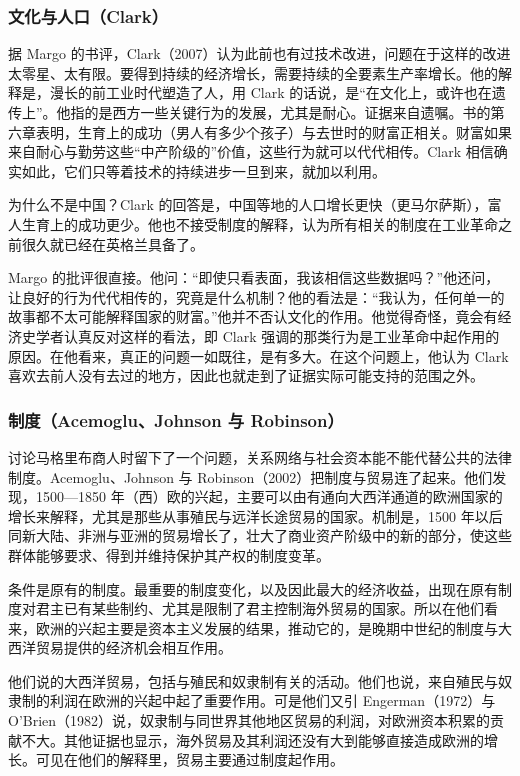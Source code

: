 \subsubsection{文化与人口（Clark）}
据 Margo 的书评，Clark（2007）认为此前也有过技术改进，问题在于这样的改进太零星、太有限。要得到持续的经济增长，需要持续的全要素生产率增长\cite{clark2007,margo2008}。他的解释是，漫长的前工业时代塑造了人，用 Clark 的话说，是“在文化上，或许也在遗传上”。他指的是西方一些关键行为的发展，尤其是耐心\cite{clark2007,margo2008}。证据来自遗嘱。书的第六章表明，生育上的成功（男人有多少个孩子）与去世时的财富正相关。财富如果来自耐心与勤劳这些“中产阶级的”价值，这些行为就可以代代相传。Clark 相信确实如此，它们只等着技术的持续进步一旦到来，就加以利用\cite{margo2008}。

为什么不是中国？Clark 的回答是，中国等地的人口增长更快（更马尔萨斯），富人生育上的成功更少。他也不接受制度的解释，认为所有相关的制度在工业革命之前很久就已经在英格兰具备了\cite{margo2008}。

Margo 的批评很直接。他问：“即使只看表面，我该相信这些数据吗？”他还问，让良好的行为代代相传的，究竟是什么机制？他的看法是：“我认为，任何单一的故事都不太可能解释国家的财富。”\cite{margo2008}他并不否认文化的作用。他觉得奇怪，竟会有经济史学者认真反对这样的看法，即 Clark 强调的那类行为是工业革命中起作用的原因。在他看来，真正的问题一如既往，是有多大。在这个问题上，他认为 Clark 喜欢去前人没有去过的地方，因此也就走到了证据实际可能支持的范围之外\cite{margo2008}。

\subsubsection{制度（Acemoglu、Johnson 与 Robinson）}
讨论马格里布商人时留下了一个问题，关系网络与社会资本能不能代替公共的法律制度。Acemoglu、Johnson 与 Robinson（2002）把制度与贸易连了起来\cite{ajr2002}。他们发现，1500—1850 年（西）欧的兴起，主要可以由有通向大西洋通道的欧洲国家的增长来解释，尤其是那些从事殖民与远洋长途贸易的国家。机制是，1500 年以后同新大陆、非洲与亚洲的贸易增长了，壮大了商业资产阶级中的新的部分，使这些群体能够要求、得到并维持保护其产权的制度变革\cite{ajr2002}。

条件是原有的制度。最重要的制度变化，以及因此最大的经济收益，出现在原有制度对君主已有某些制约、尤其是限制了君主控制海外贸易的国家\cite{ajr2002}。所以在他们看来，欧洲的兴起主要是资本主义发展的结果，推动它的，是晚期中世纪的制度与大西洋贸易提供的经济机会相互作用\cite{ajr2002}。

他们说的大西洋贸易，包括与殖民和奴隶制有关的活动。他们也说，来自殖民与奴隶制的利润在欧洲的兴起中起了重要作用\cite{ajr2002}。可是他们又引 Engerman（1972）与 O'Brien（1982）说，奴隶制与同世界其他地区贸易的利润，对欧洲资本积累的贡献不大。其他证据也显示，海外贸易及其利润还没有大到能够直接造成欧洲的增长\cite{ajr2002}。可见在他们的解释里，贸易主要通过制度起作用。

